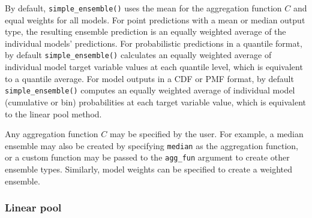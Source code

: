 \documentclass[
  article,
  shortnames,
  notitle]{jss}
\begin{document}
\begin{longtable}[]
\caption{Summary of ensemble function calculations for each output type.
The ensemble function determines the operation that is performed, and in
the case of probabilistic output types (quantile, CDF, PMF), this also
determines what ensemble distribution is generated (quantile average,
\(F_{Q}^{-1}(\theta)\), or linear pool, \(F_{LOP}(x)\)). The ensembled
predictions are returned in the same output type as the inputs. Thus,
the output type determines how the resulting ensemble distribution is
summarized (as a quantile, \(F^{-1}(\theta)\), cumulative probability,
\(F(x)\), or probability \(f(x)\)). Estimating individual model
cumulative probabilities is required to compute a
\texttt{linear\_pool()} for predictions of \texttt{quantile} output
type; see Section~\ref{sec-linear-pool} on the linear pool operation for
details. In the case of \texttt{simple\_ensemble()}, we show the
calculations for the default case where \texttt{agg\_fun\ =\ mean};
however, if another aggregation function is chosen (e.g.,
\texttt{agg\_fun\ =\ median}), that calculation would be performed
instead. For example,
\texttt{simple\_ensemble(...,\ agg\_fun\ =\ median)} applied to
predictions of mean output type would return the median of individual
model means.}\label{tbl-fns-by-output-type}\tabularnewline
\end{longtable}

By default, \texttt{simple\_ensemble()} uses the mean for the
aggregation function \(C\) and equal weights for all models. For point
predictions with a mean or median output type, the resulting ensemble
prediction is an equally weighted average of the individual models'
predictions. For probabilistic predictions in a quantile format, by
default \texttt{simple\_ensemble()} calculates an equally weighted
average of individual model target variable values at each quantile
level, which is equivalent to a quantile average. For model outputs in a
CDF or PMF format, by default \texttt{simple\_ensemble()} computes an
equally weighted average of individual model (cumulative or bin)
probabilities at each target variable value, which is equivalent to the
linear pool method.

Any aggregation function \(C\) may be specified by the user. For
example, a median ensemble may also be created by specifying
\texttt{median} as the aggregation function, or a custom function may be
passed to the \texttt{agg\_fun} argument to create other ensemble types.
Similarly, model weights can be specified to create a weighted ensemble.

\subsubsection{Linear pool}\label{sec-linear-pool}
\end{document}
